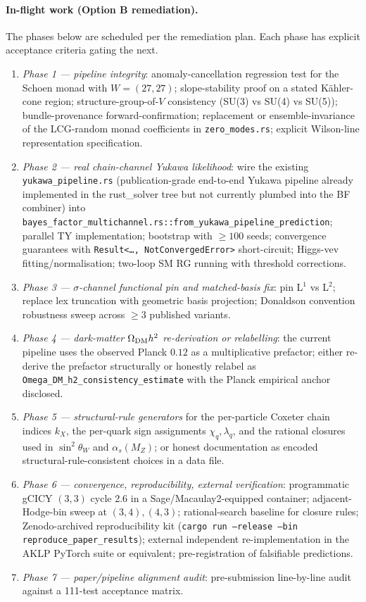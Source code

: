 ﻿\documentclass[reprint,amsmath,amssymb,aps,prd,longbibliography,floatfix]{revtex4-2}
\begin{document}
\paragraph{In-flight work (Option B remediation).}
The phases below are scheduled per the remediation plan. Each phase
has explicit acceptance criteria gating the next.
\begin{enumerate}
\item \emph{Phase 1 — pipeline integrity}: anomaly-cancellation
regression test for the Schoen monad with $W=(27,27)$;
slope-stability proof on a stated Kähler-cone region;
structure-group-of-$V$ consistency (SU(3) vs SU(4) vs SU(5));
bundle-provenance forward-confirmation; replacement or
ensemble-invariance of the LCG-random monad coefficients in
\texttt{zero\_modes.rs}; explicit Wilson-line representation
specification.
\item \emph{Phase 2 — real chain-channel Yukawa likelihood}: wire
the existing \texttt{yukawa\_pipeline.rs} (publication-grade
end-to-end Yukawa pipeline already implemented in the rust\_solver
tree but not currently plumbed into the BF combiner) into
\texttt{bayes\_factor\_multichannel.rs::from\_yukawa\_pipeline\_prediction};
parallel TY implementation; bootstrap with $\ge 100$ seeds; convergence
guarantees with \texttt{Result<\ldots, NotConvergedError>} short-circuit;
Higgs-vev fitting/normalisation; two-loop SM RG running with
threshold corrections.
\item \emph{Phase 3 — $\sigma$-channel functional pin and
matched-basis fix}: pin L$^1$ vs L$^2$; replace lex truncation with
geometric basis projection; Donaldson convention robustness sweep
across $\ge 3$ published variants.
\item \emph{Phase 4 — dark-matter $\Omega_{\rm DM} h^2$
re-derivation or relabelling}: the current pipeline uses the observed
Planck $0.12$ as a multiplicative prefactor; either re-derive the
prefactor structurally or honestly relabel as
\texttt{Omega\_DM\_h2\_consistency\_estimate} with the Planck
empirical anchor disclosed.
\item \emph{Phase 5 — structural-rule generators} for the
per-particle Coxeter chain indices $k_X$, the per-quark sign
assignments $\chi_q, \lambda_q$, and the rational closures used in
$\sin^2\theta_W$ and $\alpha_s(M_Z)$; or honest documentation as
encoded structural-rule-consistent choices in a data file.
\item \emph{Phase 6 — convergence, reproducibility, external
verification}: programmatic gCICY $(3,3)$ cycle 2.6 in a
Sage/Macaulay2-equipped container; adjacent-Hodge-bin sweep at
$(3,4), (4,3)$; rational-search baseline for closure rules;
Zenodo-archived reproducibility kit
(\texttt{cargo run --release --bin reproduce\_paper\_results});
external independent re-implementation in the AKLP PyTorch suite or
equivalent; pre-registration of falsifiable predictions.
\item \emph{Phase 7 — paper/pipeline alignment audit}: pre-submission
line-by-line audit against a 111-test acceptance matrix.
\end{enumerate}
\end{document}
